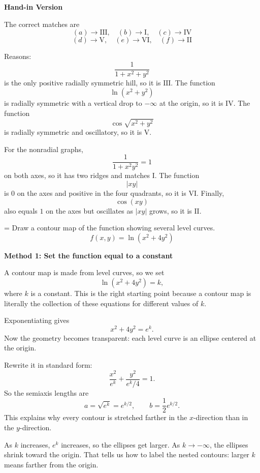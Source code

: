 \documentclass[a4paper,12pt,twocolumn]{article}
\newlength{\problemnumberwidth}
\newenvironment{solutionbox}{\begin{framed}}{\end{framed}}
\newcommand{\problem}[3]{%
  \Needspace{10\baselineskip}%
  \phantomsection\label{#1}%
  \par\vspace{0.8em}%
  \noindent
  \hangindent=\problemnumberwidth
  \hangafter=1
  \makebox[\problemnumberwidth][l]{\textbf{#2.}}#3\par
}
\begin{document}
\begin{solutionbox}
\textbf{Hand-in Version}

The correct matches are
\[
\boxed{(a)\to \mathrm{III},\quad (b)\to \mathrm{I},\quad (c)\to \mathrm{IV}}
\]
\[
\boxed{(d)\to \mathrm{V},\quad (e)\to \mathrm{VI},\quad (f)\to \mathrm{II}}
\]

Reasons:
\[
\frac{1}{1+x^2+y^2}
\]
is the only positive radially symmetric hill, so it is \(\mathrm{III}\). The function
\[
\ln(x^2+y^2)
\]
is radially symmetric with a vertical drop to \(-\infty\) at the origin, so it is \(\mathrm{IV}\). The function
\[
\cos\sqrt{x^2+y^2}
\]
is radially symmetric and oscillatory, so it is \(\mathrm{V}\).

For the nonradial graphs,
\[
\frac{1}{1+x^2y^2}=1
\]
on both axes, so it has two ridges and matches \(\mathrm{I}\). The function
\[
|xy|
\]
is \(0\) on the axes and positive in the four quadrants, so it is \(\mathrm{VI}\). Finally,
\[
\cos(xy)
\]
also equals \(1\) on the axes but oscillates as \(|xy|\) grows, so it is \(\mathrm{II}\).
\end{solutionbox}

\problem{prob:14-1-48}{48}{Draw a contour map of the function showing several level curves.
\[
f(x,y)=\ln(x^2+4y^2)
\]}

\begin{solutionbox}
\textbf{Method 1: Set the function equal to a constant}

\begin{steps}
\item A contour map is made from level curves, so we set
\[
\ln(x^2+4y^2)=k,
\]
where \(k\) is a constant. This is the right starting point because a contour map is literally the collection of these equations for different values of \(k\).

\item Exponentiating gives
\[
x^2+4y^2=e^k.
\]
Now the geometry becomes transparent: each level curve is an ellipse centered at the origin.

\item Rewrite it in standard form:
\[
\frac{x^2}{e^k}+\frac{y^2}{e^k/4}=1.
\]
So the semiaxis lengths are
\[
a=\sqrt{e^k}=e^{k/2},
\qquad
b=\frac12 e^{k/2}.
\]
This explains why every contour is stretched farther in the \(x\)-direction than in the \(y\)-direction.

\item As \(k\) increases, \(e^k\) increases, so the ellipses get larger. As \(k\to-\infty\), the ellipses shrink toward the origin. That tells us how to label the nested contours: larger \(k\) means farther from the origin.
\end{steps}
\end{solutionbox}
\end{document}
